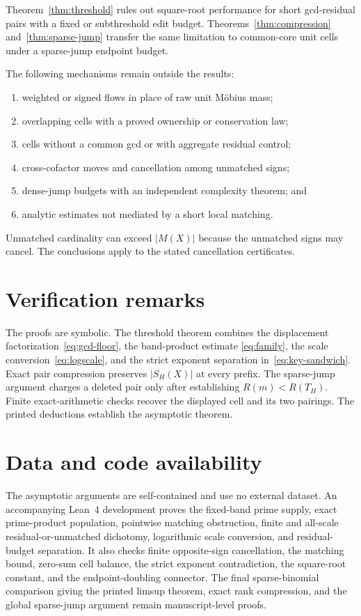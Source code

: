 \documentclass[11pt,a4paper]{amsart}
\theoremstyle{definition}
\theoremstyle{remark}
\newcommand{\M}{M}
\begin{document}
Theorem~\ref{thm:threshold} rules out square-root performance for short
gcd-residual pairs with a fixed or subthreshold edit budget.
Theorems~\ref{thm:compression} and~\ref{thm:sparse-jump} transfer the same
limitation to common-core unit cells under a sparse-jump endpoint budget.

The following mechanisms remain outside the results:
\begin{enumerate}[label=(\roman*)]
\item weighted or signed flows in place of raw unit M\"obius mass;
\item overlapping cells with a proved ownership or conservation law;
\item cells without a common gcd or with aggregate residual control;
\item cross-cofactor moves and cancellation among unmatched signs;
\item dense-jump budgets with an independent complexity theorem; and
\item analytic estimates not mediated by a short local matching.
\end{enumerate}

Unmatched cardinality can exceed $|\M(X)|$ because the unmatched signs may
cancel.  The conclusions apply to the stated cancellation certificates.

\appendix
\section{Verification remarks}

The proofs are symbolic.  The threshold theorem combines the displacement
factorization~\eqref{eq:gcd-floor}, the band-product estimate
\eqref{eq:family}, the scale conversion~\eqref{eq:logscale}, and the strict
exponent separation in~\eqref{eq:key-sandwich}.  Exact pair compression
preserves $|S_H(X)|$ at every prefix.  The sparse-jump argument charges a
deleted pair only after establishing $R(m)<R(T_H)$.  Finite exact-arithmetic
checks recover the displayed cell and its two pairings.  The printed
deductions establish the asymptotic theorem.

\section*{Data and code availability}

The asymptotic arguments are self-contained and use no external dataset.  An
accompanying Lean~4 development proves the fixed-band prime supply, exact
prime-product population, pointwise matching obstruction, finite and all-scale
residual-or-unmatched dichotomy, logarithmic scale conversion, and
residual-budget separation.  It also checks finite opposite-sign cancellation,
the matching bound, zero-sum cell balance, the strict exponent contradiction,
the square-root constant, and the endpoint-doubling connector.  The final
sparse-binomial comparison giving the printed limsup theorem, exact rank
compression, and the global sparse-jump argument remain manuscript-level
proofs.
\end{document}
